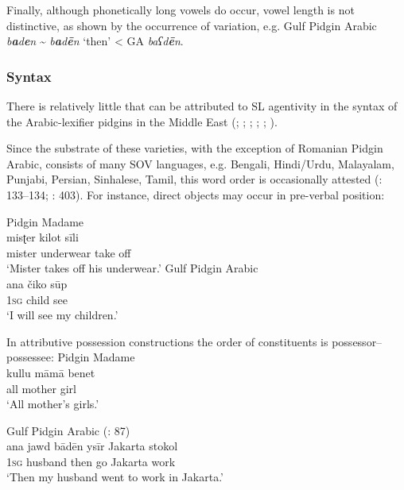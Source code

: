 \documentclass[output=paper]{langsci/langscibook}
\begin{document}
Finally, although phonetically long vowels do occur, vowel length is not distinctive, as shown by the occurrence of variation, e.g. Gulf Pidgin Arabic \textit{b\textbf{a}d\textbf{e}n} {\textasciitilde} \textit{b\textbf{a}d\textbf{ē}n} ‘then’ < GA \textit{baʕd\textbf{ē}n}. 


 \subsubsection{Syntax} 

There is relatively little that can be attributed to SL agentivity in the syntax of the Arabic-lexifier pidgins in the Middle East (\citealt{Almoaily2013}; \citealt{Al-Salman2013}; \citealt{Avram2014Pidgin}; \citealt{Bizri2014}; \citealt{Avram2017article}; \citealt{Bakir2017}).

Since the substrate of these varieties, with the exception of Romanian Pidgin Arabic, consists of many SOV languages, e.g. Bengali, Hindi/Urdu, Malayalam, Punjabi, Persian, Sinhalese, Tamil, this word order is occasionally attested (\citealt{Avram2017article}: 133–134; \citealt{Bizri2014}: 403). For instance, direct objects may occur in pre-verbal position:                                                              


\ea
\ea Pidgin Madame \citep[227]{Bizri2010}\\
\gll     misʈer kilot sīli\\
         mister underwear take off\\
\glt       `Mister takes off his underwear.'     
\newpage
\ex Gulf Pidgin Arabic \citep[133]{Avram2017article}\\
\gll     ana čiko sūp\\
         1\textsc{sg} child see\\
\glt       `I will see my children.'                                        
\z                                             
\z

In attributive possession constructions the order of constituents is possessor–possessee:                                                                                        
\ea
\ea Pidgin Madame \citep[198]{Bizri2010} \\
\gll     kullu māmā benet \\
         all mother girl    \\
\glt `All mother’s girls.'

\ex Gulf Pidgin Arabic (\citealt{Næss2008}: 87)\\
\gll     ana jawd bādēn ysīr Jakarta stokol\\
         1\textsc{sg} husband then go Jakarta work\\
\glt       `Then my husband went to work in Jakarta.' 
\z
\z
\end{document}
